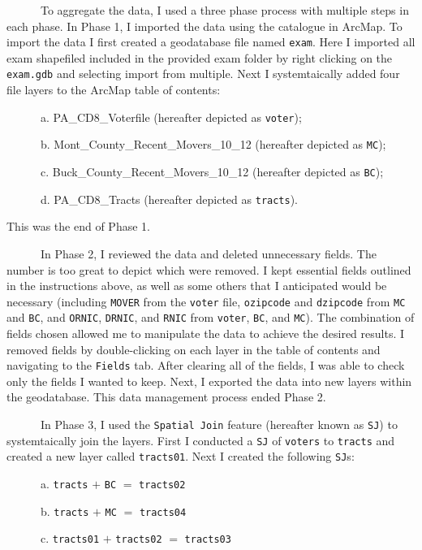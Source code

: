 \documentclass[]{article}
\begin{document}
~~~~~~To aggregate the data, I used a three phase process with multiple
steps in each phase. In Phase 1, I imported the data using the catalogue
in ArcMap. To import the data I first created a geodatabase file named
\texttt{exam}. Here I imported all exam shapefiled included in the
provided exam folder by right clicking on the \texttt{exam.gdb} and
selecting import from multiple. Next I systemtaically added four file
layers to the ArcMap table of contents:

~~~~~~a. PA\_CD8\_Voterfile (hereafter depicted as \texttt{voter});

~~~~~~b. Mont\_County\_Recent\_Movers\_10\_12 (hereafter depicted as
\texttt{MC});

~~~~~~c. Buck\_County\_Recent\_Movers\_10\_12 (hereafter depicted as
\texttt{BC});

~~~~~~d. PA\_CD8\_Tracts (hereafter depicted as \texttt{tracts}).

This was the end of Phase 1.

~~~~~~In Phase 2, I reviewed the data and deleted unnecessary fields.
The number is too great to depict which were removed. I kept essential
fields outlined in the instructions above, as well as some others that I
anticipated would be necessary (including \texttt{MOVER} from the
\texttt{voter} file, \texttt{ozipcode} and \texttt{dzipcode} from
\texttt{MC} and \texttt{BC}, and \texttt{ORNIC}, \texttt{DRNIC}, and
\texttt{RNIC} from \texttt{voter}, \texttt{BC}, and \texttt{MC}). The
combination of fields chosen allowed me to manipulate the data to
achieve the desired results. I removed fields by double-clicking on each
layer in the table of contents and navigating to the \texttt{Fields}
tab. After clearing all of the fields, I was able to check only the
fields I wanted to keep. Next, I exported the data into new layers
within the geodatabase. This data management process ended Phase 2.

~~~~~~In Phase 3, I used the \texttt{Spatial\ Join} feature (hereafter
known as \texttt{SJ}) to systemtaically join the layers. First I
conducted a \texttt{SJ} of \texttt{voters} to \texttt{tracts} and
created a new layer called \texttt{tracts01}. Next I created the
following \texttt{SJ}s:

~~~~~~a. \texttt{tracts} \(+\) \texttt{BC} \(=\) \texttt{tracts02}

~~~~~~b. \texttt{tracts} \(+\) \texttt{MC} \(=\) \texttt{tracts04}

~~~~~~c. \texttt{tracts01} \(+\) \texttt{tracts02} \(=\)
\texttt{tracts03}
\end{document}
